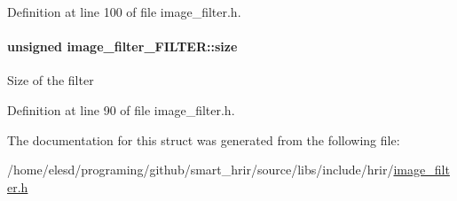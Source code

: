 Definition at line 100 of file image\-\_\-filter.\-h.

\hypertarget{a00003_a3cb3a68755dc1662ae6f82d9d8c0a815}{
\paragraph[{size}]{\setlength{\rightskip}{0pt plus 5cm}unsigned image\-\_\-filter\-\_\-\-F\-I\-L\-T\-E\-R\-::size}}\label{a00003_a3cb3a68755dc1662ae6f82d9d8c0a815}
Size of the filter 

Definition at line 90 of file image\-\_\-filter.\-h.



The documentation for this struct was generated from the following file\-:\begin{DoxyCompactItemize}
\item 
/home/elesd/programing/github/smart\-\_\-hrir/source/libs/include/hrir/\hyperlink{a00012}{image\-\_\-filter.\-h}\end{DoxyCompactItemize}
